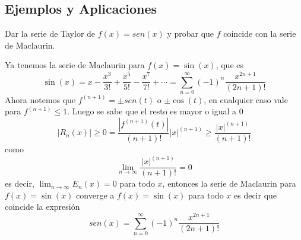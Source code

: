 \documentclass{article}
\begin{document}
\subsection{Ejemplos y Aplicaciones}

\begin{example}{1}
    Dar la serie de Taylor de $f(x) = sen(x)$ y probar que $f$ coincide con la serie de Maclaurin.
\end{example}

Ya tenemos la serie de Maclaurin para $f(x) = \sin(x)$, que es
\begin{equation*}
    \sin(x) = x - \frac{x^3}{3!} + \frac{x^5}{5!} - \frac{x^7}{7!} + \cdots = \sum_{n=0}^{\infty} (-1)^n \frac{x^{2n+1}}{(2n+1)!}
\end{equation*}
Ahora notemos que $f^{(n+1)} = \pm sen(t)$ o $ \pm \cos(t)$, en cualquier caso vale para $f^{(n+1)}\leq 1$.
Luego se sabe que el resto es mayor o igual a $0$
\begin{equation*}
    |R_n(x)| \ge 0 = \frac{|f^{(n+1)}(t)|}{(n+1)!} |x|^{(n+1)} \ge \frac{|x|^{(n+1)}}{(n+1)!}
\end{equation*}
como 
\begin{equation*}
    \lim_{n\to\infty} \frac{|x|^{(n+1)}}{(n+1)!} = 0
\end{equation*}
es decir, $\lim_{n\to\infty} E_n(x) = 0$ para todo $x$, entonces la serie de Maclaurin para $f(x) = \sin(x)$ converge a $f(x) = \sin(x)$ para todo $x$ es decir que coincide la expresión
\begin{equation*}
    sen(x) = \sum_{n=0}^{\infty} (-1)^n \frac{x^{2n+1}}{(2n+1)!}
\end{equation*}

\newpage
\end{document}
